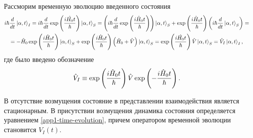Рассморим временную эволюцию введенного состояния
\begin{gather}
    i \hbar \frac{d}{dt} \ket{\alpha, t}_I = i \hbar \frac{d}{dt} \exp \left( \frac{i \hat{H_0} t}{\hbar} \right) \ket{\alpha, t}_S = \left( i \hbar \frac{d}{dt} \exp \left( \frac{i \hat{H}_0 t}{\hbar}  \right) \right) \ket{\alpha, t}_S + \exp \left( \frac{i \hat{H}_0 t}{\hbar} \right) \left( i \hbar \frac{d}{dt} \ket{\alpha, t}_S \right) = \notag \\
    = -\hat{H}_0 \exp \left( \frac{i \hat{H}_0 t}{\hbar} \right) \ket{\alpha, t}_S + \exp \left( \frac{i \hat{H}_0 t}{\hbar} \right) \left( \hat{H}_0 + \hat{V} \right) \ket{\alpha, t}_S = \exp \left( \frac{i \hat{H_0} t}{\hbar} \right) \hat{V} \ket{\alpha, t}_S = \hat{V}_I \ket{\alpha, t}_I, \label{app1-time-evolution} 
\end{gather}
где было введено обозначение
\begin{gather}
    \hat{V}_I \equiv \exp \left( \frac{i \hat{H}_0 t}{\hbar} \right) \hat{V} \exp \left( - \frac{i \hat{H}_0 t}{\hbar} \right).
\end{gather}

В отсутствие возмущения состояние в представлении взаимодействия является стационарным. В присутствии возмущения динамика состояния определяется уравнением \eqref{app1-time-evolution}, причем оператором временной эволюции становится $\hat{V}_I(t)$.
\fi
